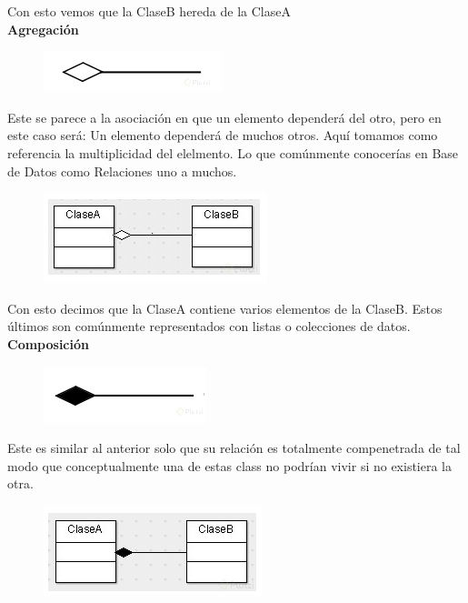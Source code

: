 \documentclass{article}
\begin{document}
Con esto vemos que la ClaseB hereda de la ClaseA\\

\textbf{Agregación}\\

\begin{figure}[h!]
  \centering
  \includegraphics[scale=0.75]{./Pictures/007_agregacion.png}
\end{figure}

Este se parece a la asociación en que un elemento dependerá del otro, pero en
este caso será: Un elemento dependerá de muchos otros. Aquí tomamos como
referencia la multiplicidad del elelmento. Lo que comúnmente conocerías en Base
de Datos como Relaciones uno a muchos.

\begin{figure}[h!]
  \centering
  \includegraphics[scale=0.75]{./Pictures/008_agregacion.png}
\end{figure}

Con esto decimos que la ClaseA contiene varios elementos de la ClaseB. Estos
últimos son comúnmente representados con listas o colecciones de datos.\\

\textbf{Composición}

\begin{figure}[h!]
  \centering
  \includegraphics[scale=0.75]{./Pictures/009_composicion.png}
\end{figure}

Este es similar al anterior solo que su relación es totalmente compenetrada de
tal modo que conceptualmente una de estas class no podrían vivir si no
existiera la otra.

\begin{figure}[h!]
  \centering
  \includegraphics[scale=0.75]{./Pictures/010_composicion.png}
\end{figure}
\end{document}
